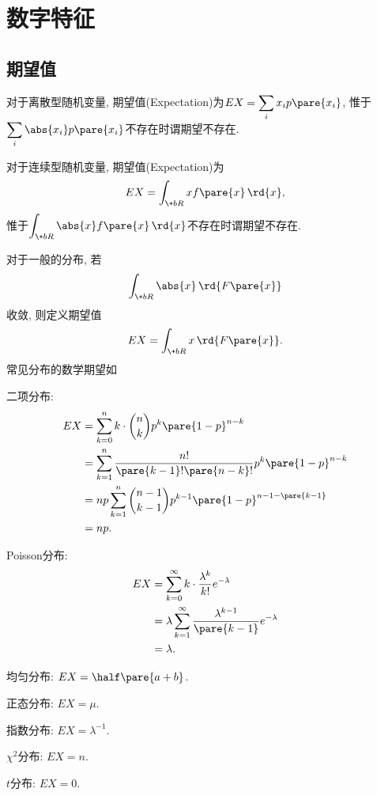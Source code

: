 \documentclass[../Statistics.tex]{subfiles}
\begin{document}
\section{数字特征} %
\label{sec:数字特征}

\subsection{期望值} %
\label{sub:期望值}

\begin{definition}
    对于离散型随机变量, 期望值(Expectation)为$EX = \displaystyle \sum_i x_ip\pare{x_i}$, 惟于$\displaystyle \sum_{i} \abs{x_i} p\pare{x_i}$不存在时谓期望不存在.
\end{definition}
\begin{definition}
    对于连续型随机变量, 期望值(Expectation)为
    \[ EX = \displaystyle \int_{\+bR} xf\pare{x}\,\rd{x}, \]
    惟于$\displaystyle \int_{\+bR} \abs{x}f\pare{x}\,\rd{x}$不存在时谓期望不存在.
\end{definition}
对于一般的分布, 若
\[ \int_{\+bR} \abs{x}\,\rd{F\pare{x}} \]
收敛, 则定义期望值
\[ EX = \int_{\+bR} x\,\rd{F\pare{x}}. \]
常见分布的数学期望如
\begin{cenum}
    \item 二项分布:
    \begin{align*}
        EX &= \sum_{k=0}^n k\cdot\binom{n}{k} p^k\pare{1-p}^{n-k} \\
        &= \sum_{k=1}^n \frac{n!}{\pare{k-1}!\pare{n-k}!} p^k\pare{1-p}^{n-k} \\
        &= np \sum_{k=1}^n \binom{n-1}{k-1} p^{k-1}\pare{1-p}^{n-1-\pare{k-1}} \\
        &= np.
    \end{align*}
    \item Poisson分布:
    \begin{align*}
        EX &= \sum_{k=0}^\infty k\cdot \frac{\lambda^k}{k!}e^{-\lambda} \\
        &= \lambda \sum_{k=1}^\infty \frac{\lambda^{k-1}}{\pare{k-1}}e^{-\lambda} \\
        &= \lambda.
    \end{align*}
    \item 均匀分布: $\displaystyle EX = \half\pare{a+b}$.
    \item 正态分布: $\displaystyle EX = \mu$.
    \item 指数分布: $\displaystyle EX = \lambda^{-1}$.
    \item $\chi^2$分布: $\displaystyle EX = n$.
    \item $t$分布: $\displaystyle EX = 0$.
\end{cenum}
\end{document}
